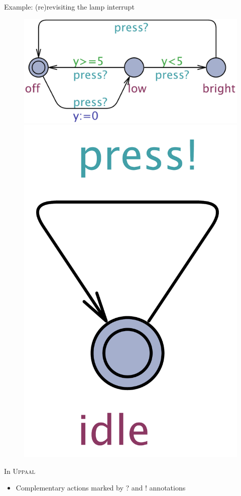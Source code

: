 \documentclass{beamer}
\def\uppaal{\textsc{Uppaal}}
\begin{document}
\begin{slide}{Example: (re)revisiting the lamp interrupt}
\small

\begin{figure}[htb]
  \centering
  \includegraphics[scale=0.25]{./images/Lamp.pdf}
  \includegraphics[scale=0.09]{./images/User.pdf}\\
\end{figure}


\vfill
\begin{block}{In \uppaal}
\begin{itemize}
\item Complementary
  actions marked by \alert{?} and \alert{!} annotations
\end{itemize}
\end{block}
\end{slide}
\end{document}
